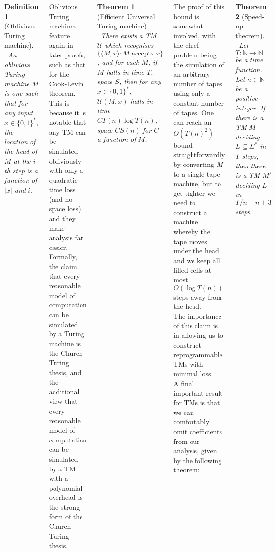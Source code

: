 \documentclass{tikzposter} %
\newtheorem{theorem}{Theorem}
\newtheorem{definition}{Definition}
\begin{document}
\begin{columns}
{{  \begin{definition}[Oblivious Turing machine]
  \ An oblivious Turing machine $M$ is one such that for any input $x \in \{0,1\}^{*}$, the location of the head of $M$ at the $i$th step is a function of $|x|$ and $i$.
  \end{definition}
  \hphantom{}

  Oblivious Turing machines feature again in later proofs, such as that for the Cook-Levin theorem. This is because it is notable that any TM can be simulated obliviously with only a quadratic time loss (and no space loss), and they make analysis far easier. \\

  Formally, the claim that every reasonable model of computation can be simulated by a Turing machine is the Church-Turing thesis, and the additional view that every reasonable model of computation can be simulated by a TM with a polynomial overhead is the strong form of the Church-Turing thesis. \\

  \begin{theorem}[Efficient Universal Turing machine]
  \ There exists a TM $\mathcal{U}$ which recognises $\{\langle M, x \rangle : M \text{ accepts } x\}$, and for each $M$, if $M$ halts in time $T$, space $S$, then for any $x \in \{0,1\}^{*}$, $\mathcal{U}(M,x)$ halts in time $C T(n) \log T(n)$, space $C S(n)$ for $C$ a function of $M$.
  \end{theorem}
  \hphantom{}

  The proof of this bound is somewhat involved, with the chief problem being the simulation of an arbitrary number of tapes using only a constant number of tapes. One can reach an $O(T(n)^{2})$ bound straightforwardly by converting $M$ to a single-tape machine, but to get tighter we need to construct a machine whereby the tape moves under the head, and we keep all filled cells at most $O(\log T(n))$ steps away from the head. \\

  The importance of this claim is in allowing us to construct reprogrammable TMs with minimal loss. \\

  A final important result for TMs is that we can comfortably omit coefficients from our analysis, given by the following theorem: \\

   \begin{theorem}[Speed-up theorem]
  \ Let $T : \mathbb{N} \to \mathbb{N}$ be a time function. Let $n \in \mathbb{N}$ be a positive integer. If there is a TM $M$ deciding $L \subseteq \Sigma^{*}$ in $T$ steps, then there is a TM $M'$ deciding $L$ in $T/n + n + 3$ steps.
  \end{theorem}
  \hphantom{}

}}
\end{columns}
\end{document}
